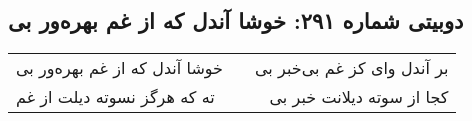 \begin{center}
\section*{دوبیتی شماره ۲۹۱: خوشا آندل که از غم بهره‌ور بی}
\label{sec:291}
\begin{longtable}{l p{0.5cm} r}
خوشا آندل که از غم بهره‌ور بی
&&
بر آندل وای کز غم بی‌خبر بی
\\
ته که هرگز نسوته دیلت از غم
&&
کجا از سوته دیلانت خبر بی
\\
\end{longtable}
\end{center}
